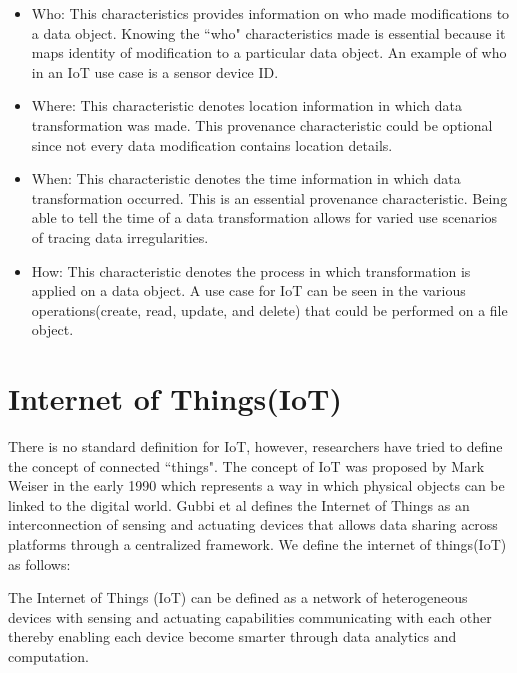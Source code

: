 \begin{itemize}

\item Who: This characteristics provides information on who made modifications to a data object. Knowing the ``who" characteristics made is essential because it maps identity of modification to a particular data object. An example of who in an IoT use case is a sensor device ID.

\item Where: This characteristic denotes location information in which data transformation was made. This provenance characteristic could be optional since not every data modification contains location details.

\item When: This characteristic denotes the time information in which data transformation occurred. This is an essential provenance characteristic. Being able to tell the time of a data transformation allows for varied use scenarios of tracing data irregularities.

\item How: This characteristic denotes the process in which transformation is applied on a data object. A use case for IoT can be seen in the various operations(create, read, update, and delete) that could be performed on a file object.

\end{itemize}


 
\section{Internet of Things(IoT)}
There is no standard definition for IoT, however, researchers have tried to define the concept of connected ``things". The concept of IoT was proposed by Mark Weiser in the early 1990 \cite{Mattern} which represents a way in which physical objects can be linked to the digital world. Gubbi et al \cite{park_provenance-based_2012} defines the Internet of Things as  an interconnection of sensing and actuating devices that allows data sharing across platforms through a centralized framework. We define the internet of things(IoT) as follows:

\begin{definition}
The Internet of Things (IoT) can be defined as a network of heterogeneous devices with sensing and actuating capabilities communicating with each other thereby enabling each device become smarter through data analytics and computation. 

\end{definition}

